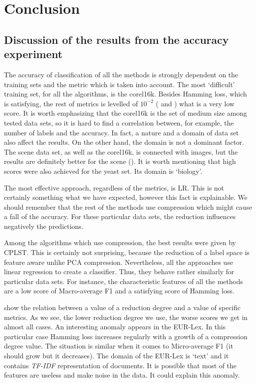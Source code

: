 \chapter{Conclusion}

\section{Discussion of the results from the accuracy experiment}

The accuracy of classification of all the methods is strongly dependent on the training sets and the metric which is taken into account. The most `difficult' training set, for all the algorithms, is the corel16k. Besides Hamming loss, which is satisfying, the rest of metrics is levelled of $10^{-2}$ ( and ) what is a very low score. It is worth emphasizing that the corel16k is the set of medium size among tested data sets, so it is hard to find a correlation between, for example, the number of labels and the accuracy. In fact, a nature and a domain of data set also affect the results. On the other hand, the domain is not a dominant factor. The scene data set, as well as the corel16k, is connected with images, but the results are definitely better for the scene (). It is worth mentioning that high scores were also achieved for the yeast set. Its domain is `biology'.

The most effective approach, regardless of the metrics, is LR. This is not certainly something what we have expected, however this fact is explainable. We should remember that the rest of the methods use compression which might cause a fall of the accuracy. For these particular data sets, the reduction influences negatively the predictions. 

Among the algorithms which use compression, the best results were given by CPLST. This is certainly not surprising, because the reduction of a label space is feature aware unlike PCA compression. Nevertheless, all the approaches use linear regression to create a classifier. Thus, they behave rather similarly for particular data sets. For instance, the characteristic features of all the methods are a low score of Macro-average F1 and a satisfying score of Hamming loss. 

 show the relation between a value of a reduction degree and a value of specific metrics. As we see, the lower reduction degree we use, the worse scores we get in almost all cases. An interesting anomaly appears in the EUR-Lex. In this particular case Hamming loss increases regularly with a growth of a compression degree value. The situation is similar when it comes to Micro-average F1 (it should grow but it decreases). The domain of the EUR-Lex is `text' and it contains \textit{TF-IDF} representation of documents. It is possible that most of the features are useless and make noise in the data. It could explain this anomaly.  

